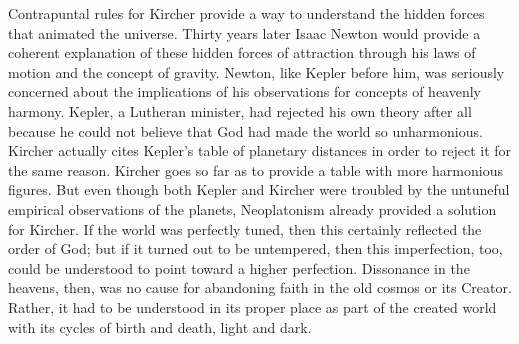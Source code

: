Contrapuntal rules for Kircher provide a way to understand the hidden forces
that animated the universe.%
    \Autocites
    {Gouk:Harmonics}
    {Gouk:MusicScienceMagic}
Thirty years later Isaac Newton would provide a coherent explanation of these
hidden forces of attraction through his laws of motion and the concept of
gravity.
Newton, like Kepler before him, was seriously concerned about the implications
of his observations for concepts of heavenly harmony.
Kepler, a Lutheran minister, had rejected his own theory after all because he
could not believe that God had made the world so unharmonious.%
    \citXXX[Hawking?]
Kircher actually cites Kepler's table of planetary distances in order to
reject it for the same reason.%
    \Autocite[\XXX]{Kircher:Musurgia}
Kircher goes so far as to provide a  table with more
harmonious figures.
But even though both Kepler and Kircher were troubled by the untuneful empirical
observations of the planets, Neoplatonism already provided a solution for
Kircher. 
If the world was perfectly tuned, then this certainly reflected the order of
God; but if it turned out to be untempered, then this imperfection, too, could
be understood to point toward a higher perfection.  Dissonance in the heavens,
then, was no cause for abandoning faith in the old cosmos or its Creator.
Rather, it had to be understood in its proper place as part of the created world
with its cycles of birth and death, light and dark.

